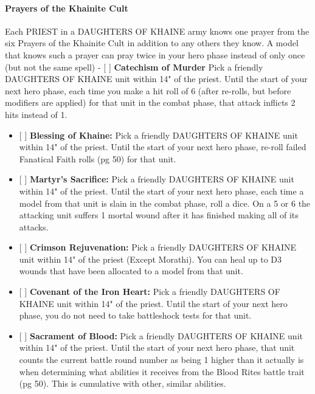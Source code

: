 \hypertarget{prayers-of-the-khainite-cult}{%
\paragraph{Prayers of the Khainite
Cult}\label{prayers-of-the-khainite-cult}}

Each PRIEST in a DAUGHTERS OF KHAINE army knows one prayer from the six
Prayers of the Khainite Cult in addition to any others they know. A
model that knows such a prayer can pray twice in your hero phase instead
of only once (but not the same spell) - {[} {]} \textbf{Catechism of
Murder} Pick a friendly DAUGHTERS OF KHAINE unit within 14" of the
priest. Until the start of your next hero phase, each time you make a
hit roll of 6 (after re-rolls, but before modifiers are applied) for
that unit in the combat phase, that attack inflicts 2 hits instead of 1.

\begin{itemize}
\item
  {[} {]} \textbf{Blessing of Khaine:} Pick a friendly DAUGHTERS OF
  KHAINE unit within 14" of the priest. Until the start of your next
  hero phase, re-roll failed Fanatical Faith rolls (pg 50) for that
  unit.
\item
  {[} {]} \textbf{Martyr's Sacrifice:} Pick a friendly DAUGHTERS OF
  KHAINE unit within 14" of the priest. Until the start of your next
  hero phase, each time a model from that unit is slain in the combat
  phase, roll a dice. On a 5 or 6 the attacking unit suffers 1 mortal
  wound after it has finished making all of its attacks.
\item
  {[} {]} \textbf{Crimson Rejuvenation:} Pick a friendly DAUGHTERS OF
  KHAINE unit within 14" of the priest (Except Morathi). You can heal up
  to D3 wounds that have been allocated to a model from that unit.
\item
  {[} {]} \textbf{Covenant of the Iron Heart:} Pick a friendly DAUGHTERS
  OF KHAINE unit within 14" of the priest. Until the start of your next
  hero phase, you do not need to take battleshock tests for that unit.
\item
  {[} {]} \textbf{Sacrament of Blood:} Pick a friendly DAUGHTERS OF
  KHAINE unit within 14" of the priest. Until the start of your next
  hero phase, that unit counts the current battle round number as being
  1 higher than it actually is when determining what abilities it
  receives from the Blood Rites battle trait (pg 50). This is cumulative
  with other, similar abilities.
\end{itemize}

